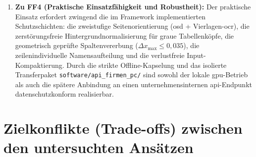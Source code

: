 \begin{enumerate}
  \item \textbf{Zu FF4 (Praktische Einsatzfähigkeit und Robustheit):} Der praktische Einsatz erfordert zwingend die im Framework implementierten Schutzschichten: die zweistufige Seitenorientierung (\ac{osd} + Vierlagen-\ac{ocr}), die zerstörungsfreie Hintergrundnormalisierung für graue Tabellenköpfe, die geometrisch geprüfte Spaltenvererbung ($\Delta x_{\max} \le 0{,}035$), die zeilenindividuelle Namensaufteilung und die verlustfreie Input-Kompaktierung. Durch die strikte Offline-Kapselung und das isolierte Transferpaket \texttt{software/api\_firmen\_pc/} sind sowohl der lokale \ac{gpu}-Betrieb als auch die spätere Anbindung an einen unternehmensinternen \ac{api}-Endpunkt datenschutzkonform realisierbar.
\end{enumerate}

\section{Zielkonflikte (Trade-offs) zwischen den untersuchten Ansätzen}
\label{sec:diskussion-tradeoffs}

